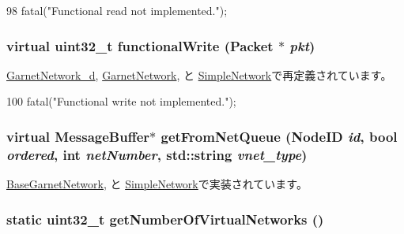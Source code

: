 \begin{DoxyCode}
98     { fatal("Functional read not implemented.\n"); }
\end{DoxyCode}
\hypertarget{classNetwork_a31a4b7e2a90a59a684d84d1284683986}{
\subsubsection[{functionalWrite}]{\setlength{\rightskip}{0pt plus 5cm}virtual {\bf uint32\_\-t} functionalWrite ({\bf Packet} $\ast$ {\em pkt})}}
\label{classNetwork_a31a4b7e2a90a59a684d84d1284683986}


\hyperlink{classGarnetNetwork__d_ad07b9def1d6f5e5f988a254c3a9d1ad9}{GarnetNetwork\_\-d}, \hyperlink{classGarnetNetwork_ad07b9def1d6f5e5f988a254c3a9d1ad9}{GarnetNetwork}, と \hyperlink{classSimpleNetwork_ad07b9def1d6f5e5f988a254c3a9d1ad9}{SimpleNetwork}で再定義されています。


\begin{DoxyCode}
100     { fatal("Functional write not implemented.\n"); }
\end{DoxyCode}
\hypertarget{classNetwork_a28233bfa034d11609e66d504bce62359}{
\subsubsection[{getFromNetQueue}]{\setlength{\rightskip}{0pt plus 5cm}virtual {\bf MessageBuffer}$\ast$ getFromNetQueue ({\bf NodeID} {\em id}, \/  bool {\em ordered}, \/  int {\em netNumber}, \/  std::string {\em vnet\_\-type})}}
\label{classNetwork_a28233bfa034d11609e66d504bce62359}


\hyperlink{classBaseGarnetNetwork_a95cf297000502b35bd0666d6b034b9bf}{BaseGarnetNetwork}, と \hyperlink{classSimpleNetwork_a8689f6299b0ac00d6ae6075a60829884}{SimpleNetwork}で実装されています。\hypertarget{classNetwork_ad5f3f9c517eb104939162472860e9637}{
\subsubsection[{getNumberOfVirtualNetworks}]{\setlength{\rightskip}{0pt plus 5cm}static {\bf uint32\_\-t} getNumberOfVirtualNetworks ()}}
\label{classNetwork_ad5f3f9c517eb104939162472860e9637}



